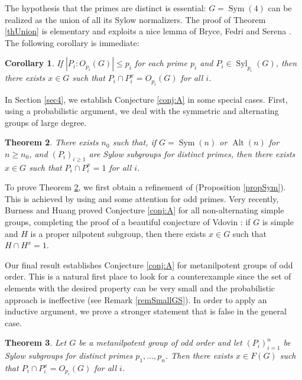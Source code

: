 \documentclass[11pt]{amsart}
\numberwithin{equation}{section}
\newtheorem{theorem}{Theorem}[section]
\newtheorem{corollary}[theorem]{Corollary}
\theoremstyle{definition}
\theoremstyle{remark}
\newcommand{\Sym}{\mathop{\mathrm{Sym}}}
\newcommand{\Alt}{\mathop{\mathrm{Alt}}}
\newcommand{\Syl}{\mathop{\mathrm{Syl}}}
\begin{document}
The hypothesis that the primes are distinct is essential:
$G = \Sym(4)$ can be realized as the union of all its Sylow normalizers.
The proof of Theorem \ref{thUnion}
is elementary
and exploits a nice lemma of Bryce, Fedri and Serena \cite{BFS95}.
The following corollary is immediate:

\begin{corollary}
If $|P_i:O_{p_i}(G)| \leq p_i$ for each prime $p_i$ and $P_i \in \Syl_{p_i}(G)$,
then there exists $x \in G$ such that $P_i \cap P_i^x = O_{p_i}(G)$ for all $i$.
\end{corollary} 

In Section \ref{sec4}, we establish Conjecture \ref{conj:A} in some special cases.
First, using a probabilistic argument, we deal with the symmetric and alternating groups of large degree.

\begin{theorem} \label{thSym}
There exists $n_0$ such that, if $G=\Sym(n)$ or $\Alt(n)$ for $n \geq n_0$,
and $(P_i)_{i \geq 1}$ are Sylow subgroups for distinct primes,
then there exists $x \in G$ such that $P_i \cap P_i^x =1$ for all $i$.
\end{theorem} 

To prove Theorem \ref{thSym}, we first obtain a refinement of \cite[Th. 1.1]{DGG+25} (Proposition \ref{propSym}).
This is achieved by using \cite{Ebe25} and some attention for odd primes.
Very recently, Burness and Huang \cite{BH25} proved Conjecture \ref{conj:A}
for all non-alternating simple groups,
completing the proof of a beautiful conjecture of Vdovin \cite[Prob. 15.40]{Kou22}:
if $G$ is simple and $H$ is a proper nilpotent subgroup,
then there exists $x \in G$ such that $H \cap H^x=1$.

Our final result establishes Conjecture \ref{conj:A} for metanilpotent groups of odd order.
This is a natural first place to look for a counterexample since the set of elements with the desired
property can be very small and the probabilistic approach is ineffective (see Remark \ref{remSmallGS}).
In order to apply an inductive argument, we prove a stronger statement that is false in the general case.

\begin{theorem} \label{thMetaNilp}
Let $G$ be a metanilpotent group of odd order
and let $(P_i)_{i=1}^n$ be Sylow subgroups for distinct primes $p_1,\ldots,p_n$.
Then there exists $x \in F(G)$ such that $P_i \cap P_i^x = O_{p_i}(G)$ for all $i$.
\end{theorem} 
\end{document}
